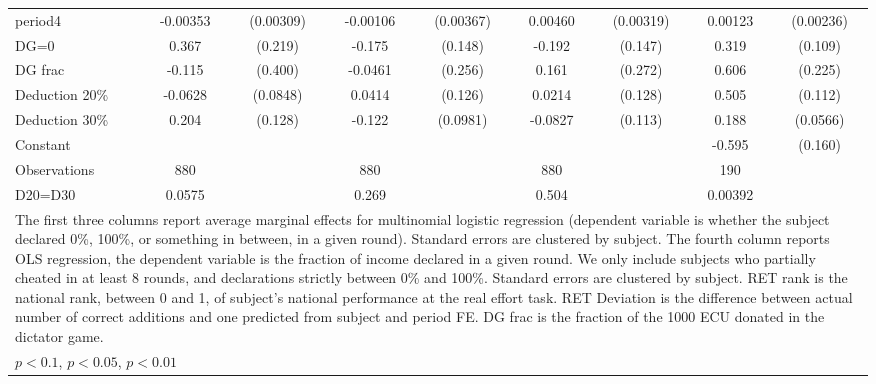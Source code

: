 \begin{tabular}{l|cccccc|cc}
period4         & -0.00353         &(0.00309)& -0.00106         &(0.00367)&  0.00460         &(0.00319)&  0.00123         &(0.00236)\\
DG=0          &    0.367\sym{*}  &  (0.219)&   -0.175         &  (0.148)&   -0.192         &  (0.147)&    0.319\sym{***}&  (0.109)\\
DG frac         &   -0.115         &  (0.400)&  -0.0461         &  (0.256)&    0.161         &  (0.272)&    0.606\sym{**} &  (0.225)\\
Deduction 20\%&  -0.0628         & (0.0848)&   0.0414         &  (0.126)&   0.0214         &  (0.128)&    0.505\sym{***}&  (0.112)\\
Deduction 30\%&    0.204         &  (0.128)&   -0.122         & (0.0981)&  -0.0827         &  (0.113)&    0.188\sym{***}& (0.0566)\\
Constant        &                  &         &                  &         &                  &         &   -0.595\sym{***}&  (0.160)\\
\hline
Observations    &      880         &         &      880         &         &      880         &         &      190         &         \\
D20=D30         &   0.0575         &         &    0.269         &         &    0.504         &         &  0.00392         &         \\
\hline\hline
\multicolumn{9}{p{16cm}}{\tiny The first three columns report average marginal effects for multinomial logistic regression (dependent variable is whether the subject declared 0\%, 100\%, or something in between, in a given round). Standard errors are clustered by subject. The fourth column reports OLS regression, the dependent variable is the fraction of income declared in a given round. We only include subjects who partially cheated in at least 8 rounds, and declarations strictly between 0\% and 100\%. Standard errors are clustered by subject. RET rank is the national rank, between 0 and 1, of subject's national performance at the real effort task. RET Deviation is the difference between actual number of correct additions and one predicted from subject and period FE. DG frac is the fraction of the 1000 ECU donated in the dictator game.}\\
\multicolumn{9}{l}{\tiny \sym{*} \(p<0.1\), \sym{**} \(p<0.05\), \sym{***} \(p<0.01\)}\\
\end{tabular}